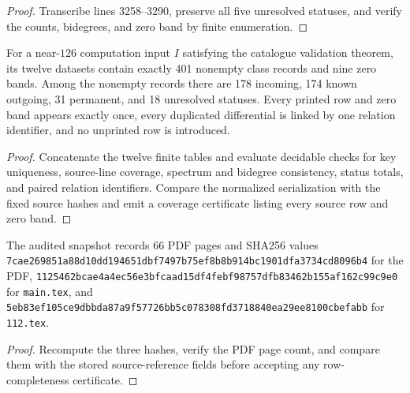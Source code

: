 \begin{proof}
  Transcribe lines 3258--3290, preserve all five unresolved statuses, and
  verify the counts, bidegrees, and zero band by finite enumeration.
\end{proof}

\begin{theorem}
  \label{thm:appendix-all-rows-encoded}
  \notready
  For a near-$126$ computation input $I$ satisfying the catalogue validation
  theorem, its twelve datasets contain exactly 401 nonempty class records and
  nine zero bands.  Among the nonempty records there are 178 incoming, 174 known
  outgoing, 31 permanent, and 18 unresolved statuses.  Every printed row and
  zero band appears exactly once, every duplicated differential is linked by
  one relation identifier, and no unprinted row is introduced.
\end{theorem}

\begin{proof}
  Concatenate the twelve finite tables and evaluate decidable checks for key
  uniqueness, source-line coverage, spectrum and bidegree consistency, status
  totals, and paired relation identifiers.  Compare the normalized
  serialization with the fixed source hashes and emit a coverage certificate
  listing every source row and zero band.
\end{proof}

\begin{proposition}
  \label{prop:paper-source-snapshot}
  \notready
  The audited snapshot records 66 PDF pages and SHA256 values
  \texttt{7cae269851a88d10dd194651dbf7497b75ef8b8b914bc1901dfa3734cd8096b4}
  for the PDF,
  \texttt{1125462bcae4a4ec56e3bfcaad15df4febf98757dfb83462b155af162c99c9e0}
  for \texttt{main.tex}, and
  \texttt{5eb83ef105ce9dbbda87a9f57726bb5c078308fd3718840ea29ee8100cbefabb}
  for \texttt{112.tex}.
\end{proposition}

\begin{proof}
  Recompute the three hashes, verify the PDF page count, and compare them with
  the stored source-reference fields before accepting any row-completeness
  certificate.
\end{proof}

